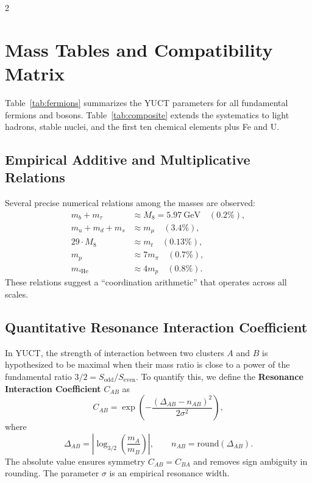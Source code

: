 \documentclass[11pt,a4paper]{article}
\begin{document}
	\begin{multicols}{2}
		
		\section{Mass Tables and Compatibility Matrix}
		\label{sec:tables}
		
		Table~\ref{tab:fermions} summarizes the YUCT parameters for all fundamental fermions and bosons. Table~\ref{tab:composite} extends the systematics to light hadrons, stable nuclei, and the first ten chemical elements plus Fe and U.
		
		\subsection{Empirical Additive and Multiplicative Relations}
		
		Several precise numerical relations among the masses are observed:
		\begin{align*}
			m_b + m_\tau &\approx M_8 = 5.97\ \text{GeV} \quad (0.2\%),\\
			m_u + m_d + m_s &\approx m_\mu \quad (3.4\%),\\
			29 \cdot M_8 &\approx m_t \quad (0.13\%),\\
			m_p &\approx 7 m_\pi \quad (0.7\%),\\
			m_{^4\mathrm{He}} &\approx 4 m_p \quad (0.8\%).
		\end{align*}
		These relations suggest a ``coordination arithmetic'' that operates across all scales.
		
		\subsection{Quantitative Resonance Interaction Coefficient}
		
		In YUCT, the strength of interaction between two clusters \(A\) and \(B\) is hypothesized to be maximal when their mass ratio is close to a power of the fundamental ratio \(3/2 = S_{\mathrm{odd}}/S_{\mathrm{even}}\). To quantify this, we define the \textbf{Resonance Interaction Coefficient} \(C_{AB}\) as
		\begin{equation}
			C_{AB} = \exp\left( - \frac{(\Delta_{AB} - n_{AB})^2}{2\sigma^2} \right),
			\label{eq:CAB}
		\end{equation}
		where
		\[
		\Delta_{AB} = \left| \log_{3/2}\left( \frac{m_A}{m_B} \right) \right|, \qquad n_{AB} = \text{round}(\Delta_{AB}).
		\]
		The absolute value ensures symmetry \(C_{AB}=C_{BA}\) and removes sign ambiguity in rounding. The parameter \(\sigma\) is an empirical resonance width. 
		

\end{multicols}
\end{document}
